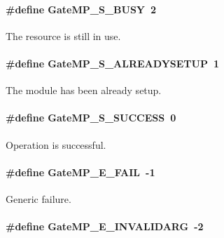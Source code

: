 \paragraph[{GateMP\_\-S\_\-BUSY}]{\setlength{\rightskip}{0pt plus 5cm}\#define GateMP\_\-S\_\-BUSY~2}\hfill\label{_gate_m_p_8h_a78c50bd892ebded475a145ae7bb71f39}


The resource is still in use. 

\paragraph[{GateMP\_\-S\_\-ALREADYSETUP}]{\setlength{\rightskip}{0pt plus 5cm}\#define GateMP\_\-S\_\-ALREADYSETUP~1}\hfill\label{_gate_m_p_8h_a0f6606bbd36e2e502cbb967cee5bd086}


The module has been already setup. 

\paragraph[{GateMP\_\-S\_\-SUCCESS}]{\setlength{\rightskip}{0pt plus 5cm}\#define GateMP\_\-S\_\-SUCCESS~0}\hfill\label{_gate_m_p_8h_a1ffb641b2f80fe24940f930986cc6dee}


Operation is successful. 

\paragraph[{GateMP\_\-E\_\-FAIL}]{\setlength{\rightskip}{0pt plus 5cm}\#define GateMP\_\-E\_\-FAIL~-\/1}\hfill\label{_gate_m_p_8h_ac75ff3b36b981b6088d9ec294a36a875}


Generic failure. 

\paragraph[{GateMP\_\-E\_\-INVALIDARG}]{\setlength{\rightskip}{0pt plus 5cm}\#define GateMP\_\-E\_\-INVALIDARG~-\/2}\hfill\label{_gate_m_p_8h_acf51ad78ae70ed3674cd379499d40fb9}


